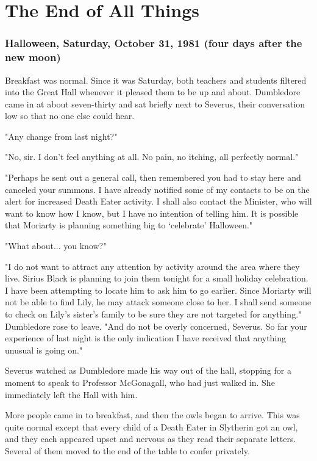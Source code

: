 
\chapter{The End of All Things}

\subsection{Halloween, Saturday, October 31, 1981 (four days after the new moon)}

Breakfast was normal. Since it was Saturday, both teachers and students filtered into the Great Hall whenever it pleased them to be up and about. Dumbledore came in at about seven-thirty and sat briefly next to Severus, their conversation low so that no one else could hear.

"Any change from last night?"

"No, sir. I don't feel anything at all. No pain, no itching, all perfectly normal."

"Perhaps he sent out a general call, then remembered you had to stay here and canceled your summons. I have already notified some of my contacts to be on the alert for increased Death Eater activity. I shall also contact the Minister, who will want to know how I know, but I have no intention of telling him. It is possible that Moriarty is planning something big to `celebrate' Halloween."

"What about... you know?"

"I do not want to attract any attention by activity around the area where they live. Sirius Black is planning to join them tonight for a small holiday celebration. I have been attempting to locate him to ask him to go earlier. Since Moriarty will not be able to find Lily, he may attack someone close to her. I shall send someone to check on Lily's sister's family to be sure they are not targeted for anything." Dumbledore rose to leave. "And do not be overly concerned, Severus. So far your experience of last night is the only indication I have received that anything unusual is going on."

Severus watched as Dumbledore made his way out of the hall, stopping for a moment to speak to Professor McGonagall, who had just walked in. She immediately left the Hall with him.

More people came in to breakfast, and then the owls began to arrive. This was quite normal except that every child of a Death Eater in Slytherin got an owl, and they each appeared upset and nervous as they read their separate letters. Several of them moved to the end of the table to confer privately.

